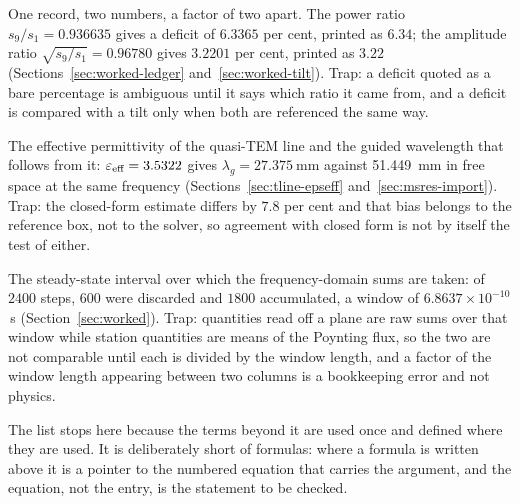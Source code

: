 \begin{description}[leftmargin=1.6em,style=nextline,itemsep=4pt]
  \item[Power deficit and amplitude deficit.]
        One record, two numbers, a factor of two apart. The power ratio $s_9/s_1=0.936635$ gives a deficit of
        $6.3365$ per cent, printed as $6.34$; the amplitude ratio $\sqrt{s_9/s_1}=0.96780$ gives $3.2201$ per
        cent, printed as $3.22$ (Sections~\ref{sec:worked-ledger} and~\ref{sec:worked-tilt}). Trap: a deficit
        quoted as a bare percentage is ambiguous until it says which ratio it came from, and a deficit is
        compared with a tilt only when both are referenced the same way.

  \item[$\eps_{\text{eff}}$ and $\lambda_g$.]
        The effective permittivity of the quasi-TEM line and the guided wavelength that follows from it:
        $\varepsilon_{\text{eff}}=3.5322$ gives $\lambda_g=\SI{27.375}{\milli\metre}$ against \SI{51.449}{\milli\metre}
        in free space at the same frequency (Sections~\ref{sec:tline-epseff} and~\ref{sec:msres-import}). Trap:
        the closed-form estimate differs by $7.8$ per cent and that bias belongs to the reference box, not to the
        solver, so agreement with closed form is not by itself the test of either.

  \item[Accumulation window and warm-up.]
        The steady-state interval over which the frequency-domain sums are taken: of $2400$ steps, $600$ were
        discarded and $1800$ accumulated, a window of $6.8637\times10^{-10}$\,s (Section~\ref{sec:worked}). Trap:
        quantities read off a plane are raw sums over that window while station quantities are means of the
        Poynting flux, so the two are not comparable until each is divided by the window length, and a factor of
        the window length appearing between two columns is a bookkeeping error and not physics.

\end{description}

The list stops here because the terms beyond it are used once and defined where they are used. It is deliberately
short of formulas: where a formula is written above it is a pointer to the numbered equation that carries the
argument, and the equation, not the entry, is the statement to be checked.
